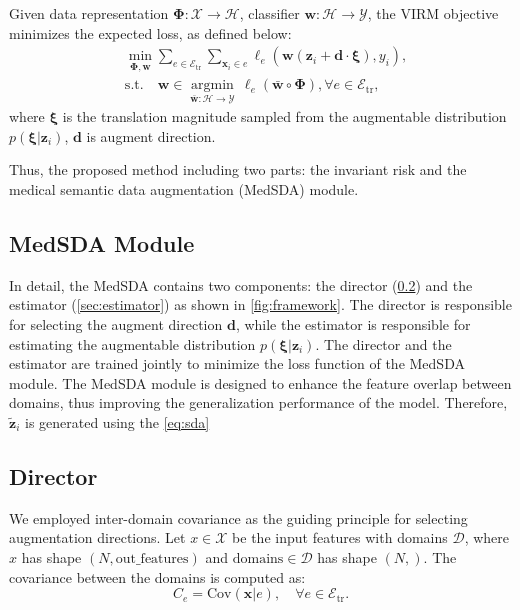 \begin{definition}[VIRM]
	\label{def:virm}
	Given data representation $\mathbf{\Phi}: \mathcal{X} \rightarrow \mathcal{H}$, classifier $\mathbf{w}: \mathcal{H} \rightarrow \mathcal{Y}$,
	the VIRM objective minimizes the expected loss, as defined below:
	\begin{equation}
		\begin{aligned}
			&\min_{\mathbf{\Phi, \mathbf{w}}}
			\sum_{e \in  \mathcal{E}_{\mathrm{tr}}} \sum_{\mathbf{x}_i \in e} \ell_e(\mathbf{w} (\mathbf{z}_i + \mathbf{d} \cdot \mathbf{\xi}), y_i), \\
			&\mathrm{s.t.} \quad \mathbf{w} \in \underset{\bar{\mathbf{w}}:\mathcal{H}\to\mathcal{Y}}{\operatorname*{\arg\min}} \, \ell_e(\bar{\mathbf{w}}\circ\mathbf{\Phi}),\forall e \in \mathcal{E}_{\mathrm{tr} },
			\end{aligned}
	\end{equation}
	where $\mathbf{\xi}$ is the translation magnitude sampled from the augmentable distribution $p(\mathbf{\xi} | \mathbf{z}_i)$, $\mathbf{d}$ is augment direction.
\end{definition}

Thus, the proposed method including two parts: the invariant risk and the medical semantic data augmentation (MedSDA) module.


\subsection{MedSDA Module}
\label{sec:medsda}
In detail, the MedSDA contains two components: the director (\cref{sec:director}) and the estimator (\cref{sec:estimator}) as shown in \cref{fig:framework}.
The director is responsible for selecting the augment direction $\mathbf{d}$,
while the estimator is responsible for estimating the augmentable distribution $p(\mathbf{\xi}|\mathbf{z}_i)$.
The director and the estimator are trained jointly to minimize the loss function of the MedSDA module.
The MedSDA module is designed to enhance the feature overlap between domains,
thus improving the generalization performance of the model.
Therefore, $\tilde{\mathbf{z}}_i$ is generated using the \cref{eq:sda}


\subsection{Director}
\label{sec:director}
We employed inter-domain covariance as the guiding principle for selecting augmentation directions.
Let $x \in \mathcal{X}$ be the input features with domains $\mathcal{D}$, where $x$ has shape $(N, \text{out\_features})$ and $\text{domains} \in \mathcal{D}$ has shape $(N,)$. The covariance between the domains is computed as:
\begin{equation}
	C_{e} = \text{Cov}(\mathbf{x} | e), \quad \forall e \in \mathcal{E}_{\mathrm{tr} }.
\end{equation}

